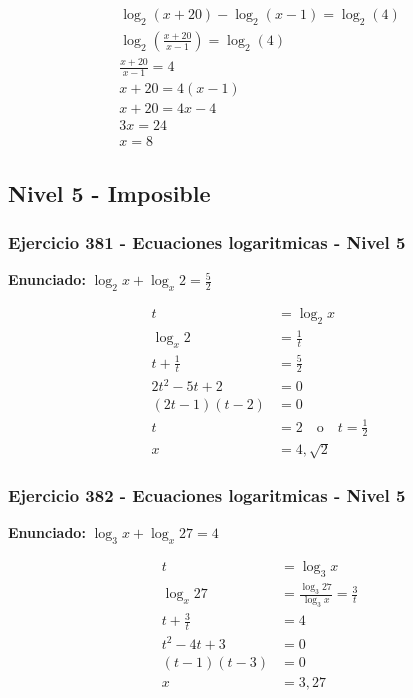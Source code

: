 \documentclass[12pt,a4paper]{article}
\begin{document}
\[
\begin{aligned}
\log_{2}\left(x+20\right) - \log_{2}\left(x-1\right)=\log_{2}\left(4\right)\\
\log_{2}\left(\frac{x+20}{x-1}\right)=\log_{2}\left(4\right)\\
\frac{x+20}{x-1}=4\\
x+20=4(x-1)\\
x+20=4x-4\\
3x=24\\
\boxed{x=8}
\end{aligned}
\]


\newpage

\subsection*{Nivel 5 - Imposible}

\subsubsection*{Ejercicio 381 - Ecuaciones logaritmicas - Nivel 5}
\textbf{Enunciado:} \(\log_2 x+\log_x 2=\frac52\)

\[
\begin{aligned}
t&=\log_2x\\
\log_x2&=\frac1t\\
t+\frac1t&=\frac52\\
2t^2-5t+2&=0\\
(2t-1)(t-2)&=0\\
t&=2\quad \text{o}\quad t=\frac12\\
x&=\boxed{4,\sqrt2}
\end{aligned}
\]


\subsubsection*{Ejercicio 382 - Ecuaciones logaritmicas - Nivel 5}
\textbf{Enunciado:} \(\log_3 x+\log_x 27=4\)

\[
\begin{aligned}
t&=\log_3x\\
\log_x27&=\frac{\log_3 27}{\log_3 x}=\frac3t\\
t+\frac3t&=4\\
t^2-4t+3&=0\\
(t-1)(t-3)&=0\\
x&=\boxed{3,27}
\end{aligned}
\]
\end{document}
